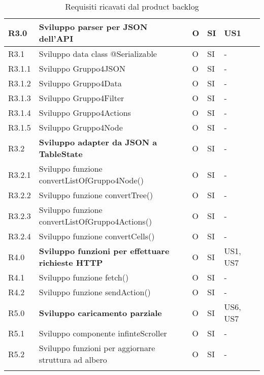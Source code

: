 \begin{longtable} {
		|>{}p{10mm}| 
		|>{}p{60mm}|
		|>{}p{15mm}|
		|>{}p{15mm}|
		|>{}p{15mm}|
		>{}p{0mm}}
	R3.0   & \textbf{Sviluppo parser per JSON dell'API}         & O & SI & US1     \\ \hline
	R3.1   & Sviluppo data class @Serializable 	   & O & SI & -     \\ \hline
	R3.1.1 & Sviluppo Gruppo4JSON & O & SI & - \\ \hline
	R3.1.2 & Sviluppo Gruppo4Data & O & SI & - \\ \hline
	R3.1.3 & Sviluppo Gruppo4Filter & O & SI & - \\ \hline
	R3.1.4 & Sviluppo Gruppo4Actions & O & SI & - \\ \hline
	R3.1.5 & Sviluppo Gruppo4Node & O & SI & - \\ \hline
	R3.2   & \textbf{Sviluppo adapter da JSON a TableState} & O & SI & -     \\ \hline
	R3.2.1   & Sviluppo funzione convertListOfGruppo4Node() & O & SI & -     \\ \hline
	R3.2.2   & Sviluppo funzione convertTree() & O & SI & -     \\ \hline
	R3.2.3   & Sviluppo funzione convertListOfGruppo4Actions() & O & SI & -     \\ \hline
	R3.2.4   & Sviluppo funzione convertCells() & O & SI & -     \\ \hline
	
	R4.0 & \textbf{Sviluppo funzioni per effettuare richieste HTTP}  & O & SI & US1, US7     \\ \hline
	R4.1   & Sviluppo funzione fetch() & O & SI & -     \\ \hline
	R4.2   & Sviluppo funzione sendAction() & O & SI & -     \\ \hline
	
	R5.0 & \textbf{Sviluppo caricamento parziale}  & O & SI & US6, US7     \\ \hline
	R5.1   & Sviluppo componente infinteScroller & O & SI & -     \\ \hline
	R5.2   & Sviluppo funzioni per aggiornare struttura ad albero & O & SI & -     \\ \hline
	\hline
	\caption{Requisiti ricavati dal product backlog}
\end{longtable}